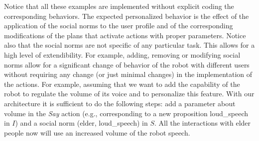 \vspace{1em}

Notice that all these examples are implemented without explicit coding the corresponding behaviors. The expected personalized behavior is the effect of the application of the social norms to the user profile and of the corresponding modifications of the plans that activate actions with proper parameters. Notice also that the social norms are not specific of any particular task. This allows for a high level of extendibility. For example, adding, removing or modifying social norms allow for a significant change of behavior of the robot with different users without requiring any change (or just minimal changes) in the implementation of the actions. For example, assuming that we want to add the capability of the robot to regulate the volume of its voice and to personalize this feature. With our architecture it is sufficient to do the following steps: add a parameter about volume in the \emph{Say} action (e.g., corresponding to a new proposition loud\_speech in $I$) and a social norm 
(elder, loud\_speech)  in $S$. All the interactions with elder people now will use an increased volume of the robot speech.

